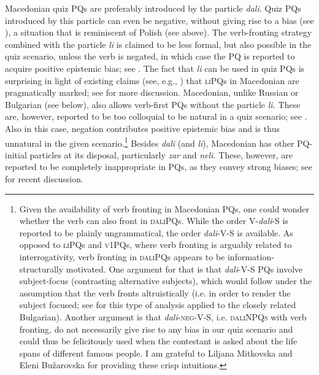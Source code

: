 \documentclass[output=paper,colorlinks,citecolor=brown]{langscibook}
\begin{document}
\noindent Macedonian quiz PQs are preferably introduced by the particle \textit{dali}. Quiz PQs introduced by this particle can even be negative, without giving rise to a bias (see ), a situation that is reminiscent of Polish (see above). The verb-fronting strategy combined with the particle \textit{li} is claimed to be less formal, but also possible in the quiz scenario, unless the verb is negated, in which case the PQ is reported to acquire positive epistemic bias; see . The fact that \textit{li} can be used in quiz PQs is surprising in light of existing claims (see, e.g., \citealt{Rudin.etal1999}) that \textsc{liPQ}s in Macedonian are pragmatically marked; see  for more discussion. Macedonian, unlike Russian or Bulgarian (see below), also allows verb-first PQs without the particle \textit{li.} These are, however, reported to be too colloquial to be natural in a quiz scenario; see . Also in this case, negation contributes positive epistemic bias and is thus unnatural in the given scenario.\footnote{Given the availability of verb fronting in Macedonian PQs, one could wonder whether the verb can also front in \textsc{daliPQ}s. While the order V-\textit{dali}-S is reported to be plainly ungrammatical, the order \textit{dali}-V-S is available. As opposed to \textsc{liPQ}s and \textsc{v1PQ}s, where verb fronting is arguably related to interrogativity, verb fronting in \textsc{daliPQ}s appears to be information-structurally motivated. One argument for that is that \textit{dali}-V-S PQs involve subject-focus (contrasting alternative subjects), which would follow under the assumption that the verb fronts altruistically (i.e. in order to render the subject focused; see \citealt{Arnaudova2001} for this type of analysis applied to the closely related Bulgarian). Another argument is that \textit{dali}-\textsc{neg}-V-S, i.e. \textsc{daliNPQs} with verb fronting, do not necessarily give rise to any bias in our quiz scenario and could thus be felicitously used when the contestant is asked about the life spans of different famous people. I am grateful to Liljana Mitkovska and Eleni Bužarovska for providing these crisp intuitions.} Besides \textit{dali} (and \textit{li}), Macedonian has other PQ-initial particles at its disposal, particularly \textit{zar} and \textit{neli.} These, however, are reported to be completely inappropriate in PQs, as they convey strong biases; see \citet{Mitkovska.Buzarovska2024} for recent discussion.
\end{document}
